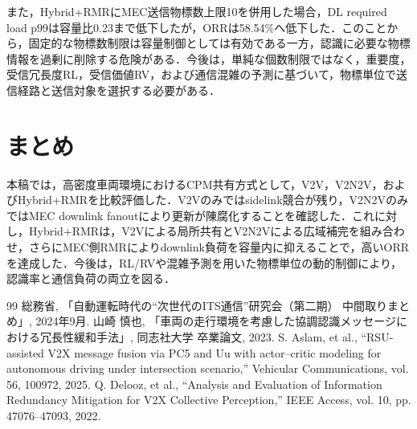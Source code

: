 \documentclass[a4paper,10pt,twocolumn,uplatex]{jsarticle}
\begin{document}
また，Hybrid+RMRにMEC送信物標数上限10を併用した場合，DL required load p99は容量比0.23まで低下したが，ORRは58.54\%へ低下した．このことから，固定的な物標数制限は容量制御としては有効である一方，認識に必要な物標情報を過剰に削除する危険がある．今後は，単純な個数制限ではなく，重要度，受信冗長度RL，受信価値RV，および通信混雑の予測に基づいて，物標単位で送信経路と送信対象を選択する必要がある．

\section{まとめ}
本稿では，高密度車両環境におけるCPM共有方式として，V2V，V2N2V，およびHybrid+RMRを比較評価した．V2Vのみではsidelink競合が残り，V2N2VのみではMEC downlink fanoutにより更新が陳腐化することを確認した．これに対し，Hybrid+RMRは，V2Vによる局所共有とV2N2Vによる広域補完を組み合わせ，さらにMEC側RMRによりdownlink負荷を容量内に抑えることで，高いORRを達成した．今後は，RL/RVや混雑予測を用いた物標単位の動的制御により，認識率と通信負荷の両立を図る．

\footnotesize{
 \begin{thebibliography}{99}
   総務省, 「自動運転時代の“次世代のITS通信”研究会（第二期） 中間取りまとめ」, 2024年9月.
   山崎 慎也, 「車両の走行環境を考慮した協調認識メッセージにおける冗長性緩和手法」, 同志社大学 卒業論文, 2023.
   S. Aslam, et al., ``RSU-assisted V2X message fusion via PC5 and Uu with actor--critic modeling for autonomous driving under intersection scenario,'' Vehicular Communications, vol. 56, 100972, 2025.
   Q. Delooz, et al., ``Analysis and Evaluation of Information Redundancy Mitigation for V2X Collective Perception,'' IEEE Access, vol. 10, pp. 47076--47093, 2022.
 \end{thebibliography}
}
\end{document}

